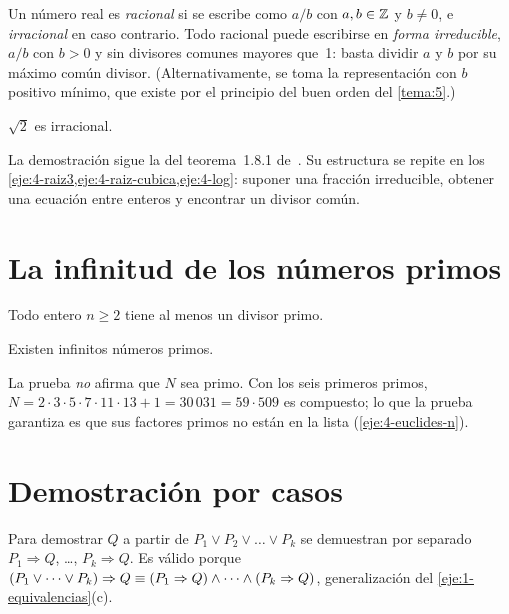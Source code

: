 Un número real es \emph{racional} si se escribe como $a/b$ con $a,b\in\mathbb{Z}$ y $b\neq 0$, e \emph{irracional} en caso contrario. Todo racional puede escribirse en \emph{forma irreducible}, $a/b$ con $b>0$ y sin divisores comunes mayores que~1: basta dividir $a$ y $b$ por su máximo común divisor. (Alternativamente, se toma la representación con $b$ positivo mínimo, que existe por el principio del buen orden del \cref{tema:5}.)

\begin{teorema}\label{teo:raiz2}
$\sqrt2$ es irracional.
\end{teorema}

La demostración sigue la del teorema~1.8.1 de~\cite{mcs}. Su estructura se repite en los \cref{eje:4-raiz3,eje:4-raiz-cubica,eje:4-log}: suponer una fracción irreducible, obtener una ecuación entre enteros y encontrar un divisor común.

\section{La infinitud de los números primos}

\begin{lema}\label{lem:divisor-primo}
Todo entero $n\ge 2$ tiene al menos un divisor primo.
\end{lema}

\begin{teorema}[Euclides]\label{teo:euclides}
Existen infinitos números primos.
\end{teorema}

\begin{observacion}
La prueba \emph{no} afirma que $N$ sea primo. Con los seis primeros primos, $N=2\cdot 3\cdot 5\cdot 7\cdot 11\cdot 13+1=30\,031=59\cdot 509$ es compuesto; lo que la prueba garantiza es que sus factores primos no están en la lista (\cref{eje:4-euclides-n}).
\end{observacion}

\section{Demostración por casos}

\begin{definicion}\label{def:casos}
Para demostrar $Q$ a partir de $P_1\vee P_2\vee\dots\vee P_k$ se demuestran por separado $P_1\Rightarrow Q$, \dots, $P_k\Rightarrow Q$. Es válido porque $(P_1\vee\dots\vee P_k)\Rightarrow Q\equiv(P_1\Rightarrow Q)\wedge\dots\wedge(P_k\Rightarrow Q)$, generalización del \cref{eje:1-equivalencias}(c).
\end{definicion}

